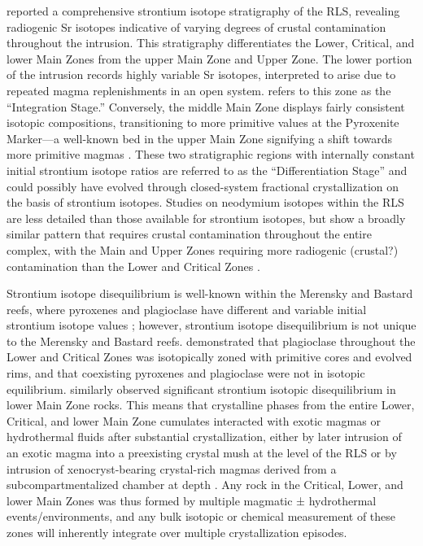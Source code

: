 \citet{kruger1994} reported a comprehensive strontium isotope stratigraphy of
the RLS, revealing radiogenic Sr isotopes indicative of varying degrees
of crustal contamination throughout the intrusion. This stratigraphy
differentiates the Lower, Critical, and lower Main Zones from the upper
Main Zone and Upper Zone. The lower portion of the intrusion records
highly variable Sr isotopes, interpreted to arise due to repeated magma
replenishments in an open system. \citet{kruger1994} refers to this zone as
the ``Integration Stage.'' Conversely, the middle Main Zone displays
fairly consistent isotopic compositions, transitioning to more primitive
values at the Pyroxenite Marker---a well-known bed in the upper Main
Zone signifying a shift towards more primitive magmas \citep{cawthorn1991}. These two stratigraphic regions with internally constant initial
strontium isotope ratios are referred to as the ``Differentiation
Stage'' and could possibly have evolved through closed-system fractional
crystallization on the basis of strontium isotopes. Studies on neodymium
isotopes within the RLS are less detailed than those available for
strontium isotopes, but show a broadly similar pattern that requires
crustal contamination throughout the entire complex, with the Main and
Upper Zones requiring more radiogenic (crustal?) contamination than the
Lower and Critical Zones \citep{maier2000}.

Strontium isotope disequilibrium is well-known within the Merensky and
Bastard reefs, where pyroxenes and plagioclase have different and
variable initial strontium isotope values \citep{seabrook2005,cawthorn2015};
however, strontium isotope disequilibrium is not unique
to the Merensky and Bastard reefs. \citet{chutas2012} demonstrated
that plagioclase throughout the Lower and Critical Zones was isotopically
zoned with primitive cores and evolved rims, and that coexisting
pyroxenes and plagioclase were not in isotopic equilibrium. \citet{roelofse2012}
similarly observed significant strontium isotopic
disequilibrium in lower Main Zone rocks. This means that crystalline
phases from the entire Lower, Critical, and lower Main Zone cumulates
interacted with exotic magmas or hydrothermal fluids after substantial
crystallization, either by later intrusion of an exotic magma into a
preexisting crystal mush at the level of the RLS \citep{chutas2012}
or by intrusion of xenocryst-bearing crystal-rich magmas derived from a
subcompartmentalized chamber at depth \citep{roelofse2012}. Any
rock in the Critical, Lower, and lower Main Zones was thus formed by
multiple magmatic ± hydrothermal events/environments, and any bulk
isotopic or chemical measurement of these zones will inherently
integrate over multiple crystallization episodes.

